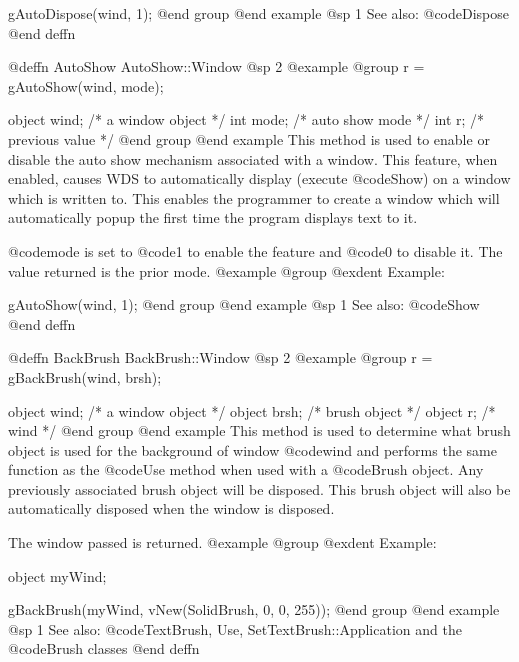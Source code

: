 gAutoDispose(wind, 1);
@end group
@end example
@sp 1
See also:  @code{Dispose}
@end deffn











@deffn {AutoShow} AutoShow::Window
@sp 2
@example
@group
r = gAutoShow(wind, mode);

object   wind;     /*  a window object    */
int      mode;     /*  auto show mode     */
int      r;        /*  previous value     */
@end group
@end example
This method is used to enable or disable the auto show mechanism
associated with a window.  This feature, when enabled, causes WDS to
automatically display (execute @code{Show}) on a window which is written
to.  This enables the programmer to create a window which will automatically
popup the first time the program displays text to it.

@code{mode} is set to @code{1} to enable the feature and @code{0}
to disable it.  The value returned is the prior mode.
@example
@group
@exdent Example:

gAutoShow(wind, 1);
@end group
@end example
@sp 1
See also:  @code{Show}
@end deffn











@deffn {BackBrush} BackBrush::Window
@sp 2
@example
@group
r = gBackBrush(wind, brsh);

object  wind;   /*  a window object   */
object  brsh;   /*  brush object      */
object  r;      /*  wind              */
@end group
@end example
This method is used to determine what brush object is used for the
background of window @code{wind} and performs the same function as the
@code{Use} method when used with a @code{Brush} object.  Any previously
associated brush object will be disposed.  This brush object will also
be automatically disposed when the window is disposed.

The window passed is returned.
@example
@group
@exdent Example:

object  myWind;

gBackBrush(myWind, vNew(SolidBrush, 0, 0, 255));
@end group
@end example
@sp 1
See also:  @code{TextBrush, Use, SetTextBrush::Application}
        and the @code{Brush} classes
@end deffn












